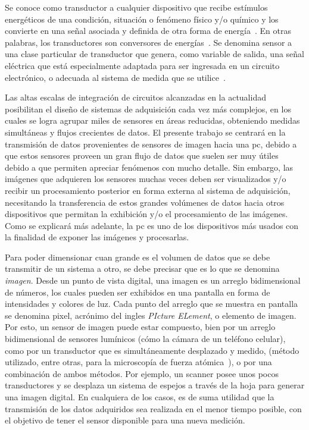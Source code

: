 Se conoce como transductor a cualquier dispositivo que recibe estímulos energéticos de una condición, situación o fenómeno físico y/o químico y los convierte en una señal asociada y definida de otra forma de energía~\cite{Pallas-Areny2001,considine1971encyclopedia}. En otras palabras, los transductores son conversores de energías~\cite{Pallas-Areny2001,considine1971encyclopedia,PerezGarcia2008}. Se denomina sensor a una clase particular de transductor que genera, como variable de salida, una señal eléctrica que está especialmente adaptada para ser ingresada en un circuito electrónico, o adecuada al sistema de medida que se utilice~\cite{Fraden2010,Slawinski2011,Ogata2002}.%

Las altas escalas de integración de circuitos alcanzadas en la actualidad posibilitan el diseño de sistemas de adquisición cada vez más complejos, en los cuales se logra agrupar miles de sensores en áreas reducidas, obteniendo medidas simultáneas y flujos crecientes de datos. El presente trabajo se centrará en la transmisión de datos provenientes de sensores de imagen hacia una \acrshort{pc}, debido a que estos sensores proveen un gran flujo de datos que suelen ser muy útiles debido a que permiten apreciar fenómenos con mucho detalle. Sin embargo, las imágenes que adquieren los sensores muchas veces deben ser visualizados y/o recibir un procesamiento posterior en forma externa al sistema de adquisición, necesitando la transferencia de estos grandes volúmenes de datos hacia otros dispositivos que permitan la exhibición y/o el procesamiento de las imágenes. Como se explicará más adelante, la \acrshort{pc} es uno de los dispositivos más usados con la finalidad de exponer las imágenes y procesarlas.%

Para poder dimensionar cuan grande es el volumen de datos que se debe transmitir de un sistema a otro, se debe precisar que es lo que se denomina \textit{imagen}. Desde un punto de vista digital, una imagen es un arreglo bidimensional de números, los cuales pueden ser exhibidos en una pantalla en forma de intensidades y colores de luz. Cada punto del arreglo que se muestra en pantalla se denomina pixel, acrónimo del ingles {\it PIcture ELement}, o elemento de imagen. Por esto, un sensor de imagen puede estar compuesto, bien por un arreglo bidimensional de sensores lumínicos (cómo la cámara de un teléfono celular), como por un transductor que es simultáneamente desplazado y medido, (método utilizado, entre otras, para la microscopía de fuerza atómica~\cite{Binnig1983}), o por una combinación de ambos métodos. Por ejemplo, un scanner posee unos pocos transductores y se desplaza un sistema de espejos a través de la hoja para generar una imagen digital. En cualquiera de los casos, es de suma utilidad que la transmisión de los datos adquiridos sea realizada en el menor tiempo posible, con el objetivo de tener el sensor disponible para una nueva medición.

